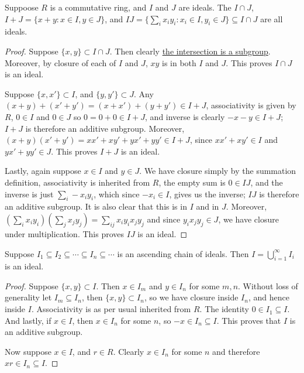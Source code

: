 \begin{proposition}\label{prop:ideal-operations}
    Suppoose \(R\) is a commutative ring,
    and \(I\) and \(J\) are ideals.
    The \(I \cap J\), \(I + J = \{x+y : x \in I, y \in J\}\),
    and \(IJ = \{\sum_i x_i y_i : x_i \in I, y_i \in J\}
    \subseteq I \cap J\) are all ideals.
\end{proposition}
\begin{proof}
    Suppose \(\{x,y\} \subset I \cap J\). Then clearly
    \hyperref[lem:intersection-subgroup]{the intersection is a subgroup}.
    Moreover, by closure of each of \(I\) and \(J\),
    \(xy\) is in both \(I\) and \(J\).
    This proves \(I \cap J\) is an ideal.

    Suppose \(\{x,x'\} \subset I\), and \(\{y,y'\} \subset J\).
    Any \((x+y)+(x'+y') = (x+x')+(y+y') \in I+J\),
    associativity is given by \(R\),
    \(0 \in I\) and \(0 \in J\) so \(0 = 0+0 \in I+J\),
    and inverse is clearly \(-x-y \in I+J\);
    \(I+J\) is therefore an additive subgroup.
    Moreover, \((x+y)(x'+y') = xx' + xy' + yx' + yy' \in I+J\),
    since \(xx' + xy' \in I\) and \(yx' + yy' \in J\).
    This proves \(I+J\) is an ideal.

    Lastly, again suppose \(x \in I\) and \(y \in J\).
    We have closure simply by the summation definition,
    associativity is inherited from \(R\),
    the empty sum is \(0 \in IJ\),
    and the inverse is just \(\sum_i -x_i y_i\),
    which since \(-x_i \in I\), gives us the inverse;
    \(IJ\) is therefore an additive subgroup.
    It is also clear that this is in \(I\) and in \(J\).
    Moreover, \((\sum_i x_i y_i)(\sum_j x_j y_j)
    = \sum_{ij} x_i y_i x_j y_j\)
    and since \(y_i x_j y_j \in J\),
    we have closure under multiplication.
    This proves \(IJ\) is an ideal.
\end{proof}
\begin{proposition}\label{prop:nested-ideals}
    Suppose \(I_1 \subseteq I_2 \subseteq \cdots \subseteq
    I_n \subseteq \cdots\) is an ascending chain of ideals.
    Then \(I = \bigcup_{i=1}^\infty I_i\) is an ideal.
\end{proposition}
\begin{proof}
    Suppose \(\{x,y\} \subset I\).
    Then \(x \in I_m\) and \(y \in I_n\) for some \(m,n\).
    Without loss of generality let \(I_m \subseteq I_n\),
    then \(\{x,y\} \subset I_n\),
    so we have closure inside \(I_n\), and hence inside \(I\).
    Associativity is as per usual inherited from \(R\).
    The identity \(0 \in I_1 \subseteq I\).
    And lastly, if \(x \in I\), then \(x \in I_n\) for some \(n\),
    so \(-x \in I_n \subseteq I\).
    This proves that \(I\) is an additive subgroup.
    
    Now suppose \(x \in I\), and \(r \in R\).
    Clearly \(x \in I_n\) for some \(n\)
    and therefore \(xr \in I_n \subseteq I\).
\end{proof}


